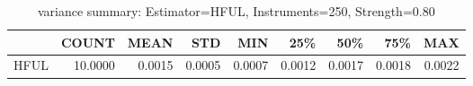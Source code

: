 \begin{table}[ht]
\centering
\caption{variance summary: Estimator=HFUL, Instruments=250, Strength=0.80}
\begin{tabular}{lrrrrrrrr}
\toprule
 & COUNT & MEAN & STD & MIN & 25\% & 50\% & 75\% & MAX \\
\midrule
HFUL & 10.0000 & 0.0015 & 0.0005 & 0.0007 & 0.0012 & 0.0017 & 0.0018 & 0.0022 \\
\bottomrule
\end{tabular}
\end{table}
